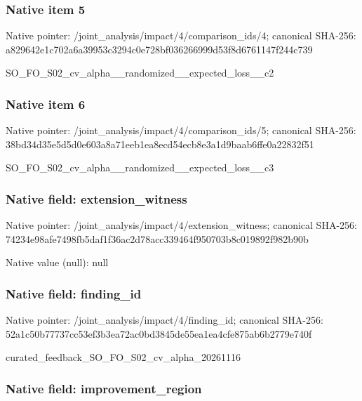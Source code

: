 \documentclass[10pt,a4paper]{article}
\begin{document}
\subsubsection{Native item 5}


Native pointer: /joint\_analysis/impact/4\allowbreak{}/comparison\_ids/4; canonical SHA-256: a829642e1c702a6a39953c32\allowbreak{}94c0e728bf036266999d53f8\allowbreak{}d6761147f244c739


SO\_FO\_S02\_cv\_alpha\_\_rand\allowbreak{}omized\_\_expected\_loss\_\_c\allowbreak{}2


\subsubsection{Native item 6}


Native pointer: /joint\_analysis/impact/4\allowbreak{}/comparison\_ids/5; canonical SHA-256: 38bd34d35e5d5d0e603a8a71\allowbreak{}eeb1ea8ecd54ecb8e3a1d9ba\allowbreak{}ab6ffe0a22832f51


SO\_FO\_S02\_cv\_alpha\_\_rand\allowbreak{}omized\_\_expected\_loss\_\_c\allowbreak{}3


\subsubsection{Native field: extension\_witness}


Native pointer: /joint\_analysis/impact/4\allowbreak{}/extension\_witness; canonical SHA-256: 74234e98afe7498fb5daf1f3\allowbreak{}6ac2d78acc339464f950703b\allowbreak{}8c019892f982b90b



Native value (null): null



\subsubsection{Native field: finding\_id}


Native pointer: /joint\_analysis/impact/4/finding\_id; canonical SHA-256: 52a1c50b77737cc53ef3b3ea\allowbreak{}72ac0bd3845de55ea1ea4cfe\allowbreak{}875ab6b2779e740f


curated\_feedback\_SO\_FO\_S\allowbreak{}02\_cv\_alpha\_20261116


\subsubsection{Native field: improvement\_region}
\end{document}
